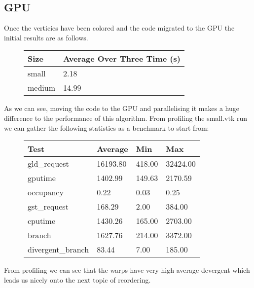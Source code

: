 \subsection*{GPU}
Once the verticies have been colored and the code migrated to the GPU the initial results are as follows.\\
\begin{figure}[H]\centering \begin{tabular}{ l | l }
  \hline
  Size & Average Over Three Time (s) \\
  \hline
  \hline
  small & 2.18 \\
  medium & 14.99 \\
  \hline
\end{tabular} \end{figure}

As we can see, moving the code to the GPU and parallelising it makes a huge difference to the performance of this algorithm.
From profiling the small.vtk run we can gather the following statistics as a benchmark to start from:\\
\begin{figure}[H]\centering \begin{tabular}{ l | l | l | l}
\hline
Test & Average & Min & Max \\
\hline
\hline
gld\_request & 16193.80 & 418.00 & 32424.00 \\
gputime & 1402.99 & 149.63 & 2170.59 \\
occupancy & 0.22 & 0.03 & 0.25 \\
gst\_request & 168.29 & 2.00 & 384.00 \\
cputime & 1430.26 & 165.00 & 2703.00 \\
branch & 1627.76 & 214.00 & 3372.00 \\
divergent\_branch & 83.44 & 7.00 & 185.00 \\
\hline
\end{tabular} \end{figure}

From profiling we can see that the warps have very high average devergent which leads us nicely onto the next topic of reordering.

